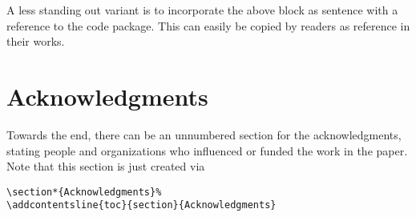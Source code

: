 \documentclass[%
  a4paper,
  twocolumn,
  colorlinks,
]{preprint}
\begin{document}
A less standing out variant is to incorporate the above block as sentence with
a reference to the code package.
This can easily be copied by readers as reference in their works.



\section*{Acknowledgments}%

Towards the end, there can be an unnumbered section for the acknowledgments,
stating people and organizations who influenced or funded the work in the paper.
Note that this section is just created via
\begin{verbatim}
\section*{Acknowledgments}%
\addcontentsline{toc}{section}{Acknowledgments}
\end{verbatim}





\end{document}
